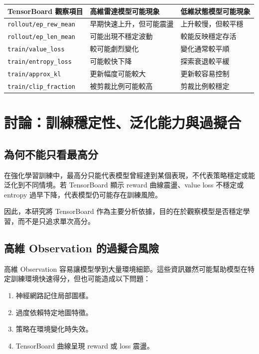 \documentclass[12pt,a4paper]{ctexart}
\begin{document}
\begin{longtable}{lll}
\toprule
TensorBoard 觀察項目 & 高維雷達模型可能現象 & 低維狀態模型可能現象 \\
\midrule
\endhead
\texttt{rollout/ep\_rew\_mean} & 早期快速上升，但可能震盪 & 上升較慢，但較平穩 \\
\texttt{rollout/ep\_len\_mean} & 可能出現不穩定波動 & 較能反映穩定存活 \\
\texttt{train/value\_loss} & 較可能劇烈變化 & 變化通常較平順 \\
\texttt{train/entropy\_loss} & 可能較快下降 & 探索衰退較平緩 \\
\texttt{train/approx\_kl} & 更新幅度可能較大 & 更新較容易控制 \\
\texttt{train/clip\_fraction} & 被剪裁比例可能較高 & 剪裁比例較穩定 \\
\bottomrule
\end{longtable}

\section{討論：訓練穩定性、泛化能力與過擬合}

\subsection{為何不能只看最高分}

在強化學習訓練中，最高分只能代表模型曾經達到某個表現，不代表策略穩定或能泛化到不同情境。若 TensorBoard 顯示 reward 曲線震盪、value loss 不穩定或 entropy 過早下降，代表模型仍可能存在訓練風險。

因此，本研究將 TensorBoard 作為主要分析依據，目的在於觀察模型是否穩定學習，而不是只追求單次高分。

\subsection{高維 Observation 的過擬合風險}

高維 Observation 容易讓模型學到大量環境細節。這些資訊雖然可能幫助模型在特定訓練環境快速得分，但也可能造成以下問題：

\begin{enumerate}
  \item 神經網路記住局部圖樣。
  \item 過度依賴特定地圖特徵。
  \item 策略在環境變化時失效。
  \item TensorBoard 曲線呈現 reward 或 loss 震盪。
\end{enumerate}
\end{document}
